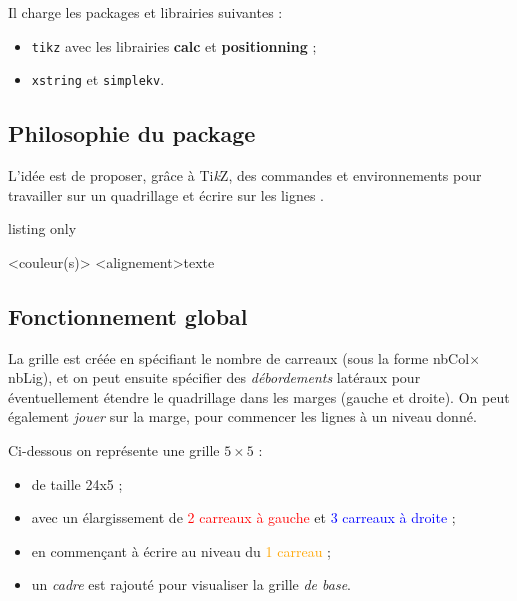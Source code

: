 \documentclass[a4paper]{article}
\providecommand\tikzlogo{Ti\textit{k}Z}
\let\TikZ\tikzlogo
\newcommand\Cle[1]{{\bfseries\sffamily\textlangle #1\textrangle}}
\begin{document}
Il charge les packages et librairies suivantes :

\begin{itemize}
	\item \texttt{tikz} avec les librairies \Cle{calc} et \Cle{positionning} ;
	\item \texttt{xstring} et \texttt{simplekv}.
\end{itemize}

\subsection{\og Philosophie \fg{} du package}

L'idée est de proposer, grâce à \TikZ, des \textsf{commandes} et \textsf{environnements} pour travailler sur un quadrillage et écrire \og sur les lignes \fg.

\begin{PresentationCode}{listing only}

\begin{EnvQuadrillage}[clés]<couleur(s)>
	\EcrireLigne[clés]<alignement>{texte}
	\PasseLigne
\end{EnvQuadrillage}
\end{PresentationCode}

\subsection{Fonctionnement global}

La grille est créée en spécifiant le nombre de carreaux (sous la forme nbCol$\times$nbLig), et on peut ensuite spécifier des \textit{débordements} latéraux pour éventuellement étendre le quadrillage dans les marges (gauche et droite). On peut également \textit{jouer} sur la marge, pour commencer les lignes à un niveau donné.

\medskip

Ci-dessous on représente une grille $5\times5$ :

\begin{itemize}
	\item de taille 24x5 ;
	\item avec un élargissement de \textcolor{red}{2 carreaux à gauche} et \textcolor{blue}{3 carreaux à droite} ;
	\item en commençant à écrire au niveau du \textcolor{orange}{1 carreau} ;
	\item un \textcolor{green!50!black}{\textit{cadre}} est rajouté pour visualiser la grille \textit{de base}.
\end{itemize}
\end{document}
